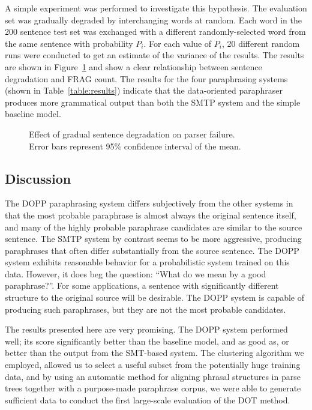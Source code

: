 A simple experiment was performed to investigate this hypothesis. The evaluation set was gradually degraded by
interchanging words at random.  Each word in the 200 sentence test set was exchanged with a different
randomly-selected word from the same sentence with probability $P_i$. For each value of $P_i$, 20 different
random runs were conducted to get an estimate of the variance of the results. The results are shown in
Figure~\ref{fig:gramaticality} and show a clear relationship between sentence degradation and FRAG count. The
results for the four paraphrasing systems (shown in Table~\ref{table:results}) indicate that the
data-oriented paraphraser produces more grammatical output than both the SMTP system and the simple baseline model.

\begin{figure} 
\begin{center}
\epsfxsize=10.6cm
\mbox{}
\end{center}
\caption{Effect of gradual sentence degradation on parser failure. \\
         Error bars represent 95\% confidence interval of the mean.}
\label{fig:gramaticality}
\end{figure}


\subsection{Discussion}
\label{sec:conclusion1}

The DOPP paraphrasing system differs subjectively from the other systems in that the most probable paraphrase is
almost always the original sentence itself, and  many of the highly probable paraphrase candidates are similar
to the source sentence. The SMTP system by contrast seems to be more aggressive,  producing paraphrases that
often differ substantially from the source sentence. The DOPP system exhibits reasonable behavior for a
probabilistic system trained on this data. However, it does beg the question:  ``What do we mean by a good
paraphrase?''. For some applications, a sentence with significantly different structure  to the original source
will be desirable. The DOPP system is capable of producing such paraphrases, but they are not the most probable
candidates.

The results presented here are very promising. The DOPP system performed well; its score significantly better than the
baseline model, and as good as, or better than the output from the SMT-based system.  The clustering algorithm we employed, allowed us to
select a useful subset from the potentially huge training data, and by using an automatic method for aligning phrasal
structures in parse trees together with a purpose-made paraphrase corpus, we were able to generate sufficient data to
conduct the first large-scale evaluation of the DOT method. 


